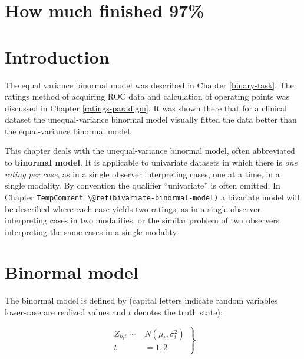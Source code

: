 \documentclass[
]{book}
\begin{document}
\hypertarget{binormal-model-how-much-finished}{%
\section{How much finished 97\%}\label{binormal-model-how-much-finished}}

\hypertarget{binormal-model-introduction}{%
\section{Introduction}\label{binormal-model-introduction}}

The equal variance binormal model was described in Chapter \ref{binary-task}. The ratings method of acquiring ROC data and calculation of operating points was discussed in Chapter \ref{ratings-paradigm}. It was shown there that for a clinical dataset the unequal-variance binormal model visually fitted the data better than the equal-variance binormal model.

This chapter deals with the unequal-variance binormal model, often abbreviated to \textbf{binormal model}. It is applicable to univariate datasets in which there is \emph{one rating per case}, as in a single observer interpreting cases, one at a time, in a single modality. By convention the qualifier ``univariate'' is often omitted. In Chapter \texttt{TempComment\ \textbackslash{}@ref(bivariate-binormal-model)} a bivariate model will be described where each case yields two ratings, as in a single observer interpreting cases in two modalities, or the similar problem of two observers interpreting the same cases in a single modality.

\hypertarget{binormal-model-definition}{%
\section{Binormal model}\label{binormal-model-definition}}

The binormal model is defined by (capital letters indicate random variables lower-case are realized values and \(t\) denotes the truth state):

\begin{equation} 
\left.
\begin{aligned}
Z_{k_tt} \sim &N\left ( \mu_t,\sigma_{t}^{2} \right )\\
t&=1,2
\end{aligned}
\right \}
\label{eq:binormal-model-z-samples-1}
\end{equation}
\end{document}
